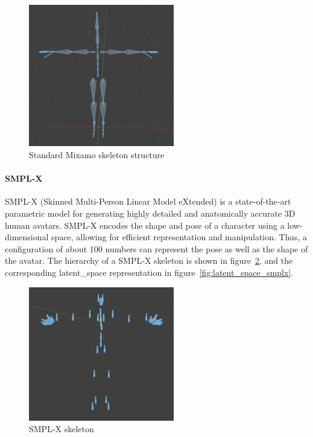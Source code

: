 \documentclass[../../main.tex]{subfiles}
\begin{document}
\begin{figure} 
  \centering \includegraphics[width = 2.5in]{chapters/background_work/images/mixamo_skeleton.png} 
  \caption{Standard Mixamo skeleton structure} 
  \label{fig:mixamo_skeleton} 
\end{figure}

\paragraph{SMPL-X}
\label{ch:background_work:sign_language_synthesis:3d_techniques:skeleton:smpl_x}

SMPL-X (Skinned Multi-Person Linear Model eXtended) is a state-of-the-art parametric model for generating highly detailed and anatomically accurate 3D human avatars. SMPL-X encodes the shape and pose of a character using a low-dimensional space, allowing for efficient representation and manipulation. Thus, a configuration of about 100 numbers can represent the pose as well as the shape of the avatar. The hierarchy of a SMPL-X skeleton is shown in figure~\ref{fig:smpl_x_skeleton}, and the corresponding \gls{latent_space} representation in figure~\ref{fig:latent_space_smplx}.

\begin{figure} 
  \centering \includegraphics[width = 2.5in]{chapters/background_work/images/smpl_x_skeleton.png} 
  \caption{SMPL-X skeleton} 
  \label{fig:smpl_x_skeleton} 
\end{figure}
\end{document}
